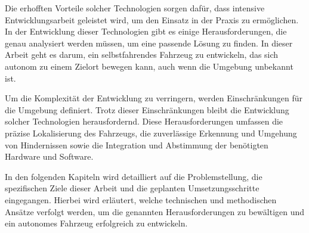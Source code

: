 Die erhofften Vorteile solcher Technologien sorgen dafür, dass intensive Entwicklungsarbeit geleistet wird, um den Einsatz in der Praxis zu ermöglichen. 
In der Entwicklung dieser Technologien gibt es einige Herausforderungen, die genau analysiert werden müssen, um eine passende Lösung zu finden. 
In dieser Arbeit geht es darum, ein selbstfahrendes Fahrzeug zu entwickeln, das sich autonom zu einem Zielort bewegen kann, auch wenn die Umgebung unbekannt ist.

Um die Komplexität der Entwicklung zu verringern, werden Einschränkungen für die Umgebung definiert. 
Trotz dieser Einschränkungen bleibt die Entwicklung solcher Technologien herausfordernd. 
Diese Herausforderungen umfassen die präzise Lokalisierung des Fahrzeugs, 
die zuverlässige Erkennung und Umgehung von Hindernissen sowie die Integration und Abstimmung der benötigten Hardware und Software.

In den folgenden Kapiteln wird detailliert auf die Problemstellung, die spezifischen Ziele dieser Arbeit und die geplanten Umsetzungsschritte eingegangen. 
Hierbei wird erläutert, welche technischen und methodischen Ansätze verfolgt werden, um die genannten Herausforderungen zu bewältigen und ein autonomes Fahrzeug erfolgreich zu entwickeln.